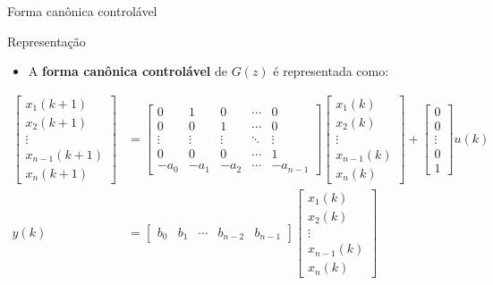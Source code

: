 \begin{frame}{Forma canônica controlável}
\begin{block}{Representação}
\begin{itemize}
    \item A \textbf{forma canônica controlável} de $G(z)$ é representada como:
\end{itemize}

\begin{align*}
    \begin{bmatrix} x_1(k+1) \\ x_2(k+1) \\ \vdots \\  x_{n-1}(k+1) \\ x_n(k+1) \end{bmatrix}
    &=
    \begin{bmatrix}
    0 & 1 & 0 & \cdots & 0 \\
    0 & 0 & 1 & \cdots & 0 \\
    \vdots & \vdots & \vdots & \ddots & \vdots \\
    0 & 0 & 0 & \cdots & 1 \\
    -a_0 & -a_1 & -a_2 & \cdots & -a_{n-1}
    \end{bmatrix}
    \begin{bmatrix} x_1(k) \\ x_2(k) \\ \vdots \\  x_{n-1}(k) \\ x_n(k) \end{bmatrix}
    +
    \begin{bmatrix}
    0 \\ 0 \\ \vdots \\ 0 \\ 1
    \end{bmatrix}
    u(k) \\
    y(k)
    &=
    \begin{bmatrix}
    b_0 & b_1 & \cdots & b_{n-2} & b_{n-1}
    \end{bmatrix}
    \begin{bmatrix}
    x_1(k) \\ x_2(k) \\ \vdots \\  x_{n-1}(k) \\ x_n(k)
    \end{bmatrix}
\end{align*}
\end{block}
\end{frame}

